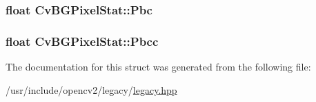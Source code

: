 \hypertarget{structCvBGPixelStat_acfe036c8c4bb456ae384f43ebddd1629}{
\subsubsection[{Pbc}]{\setlength{\rightskip}{0pt plus 5cm}float Cv\-B\-G\-Pixel\-Stat\-::\-Pbc}}\label{structCvBGPixelStat_acfe036c8c4bb456ae384f43ebddd1629}
\hypertarget{structCvBGPixelStat_a7d5b13421a935222967e1a30d14ea4f7}{
\subsubsection[{Pbcc}]{\setlength{\rightskip}{0pt plus 5cm}float Cv\-B\-G\-Pixel\-Stat\-::\-Pbcc}}\label{structCvBGPixelStat_a7d5b13421a935222967e1a30d14ea4f7}


The documentation for this struct was generated from the following file\-:\begin{DoxyCompactItemize}
\item 
/usr/include/opencv2/legacy/\hyperlink{legacy_8hpp}{legacy.\-hpp}\end{DoxyCompactItemize}
